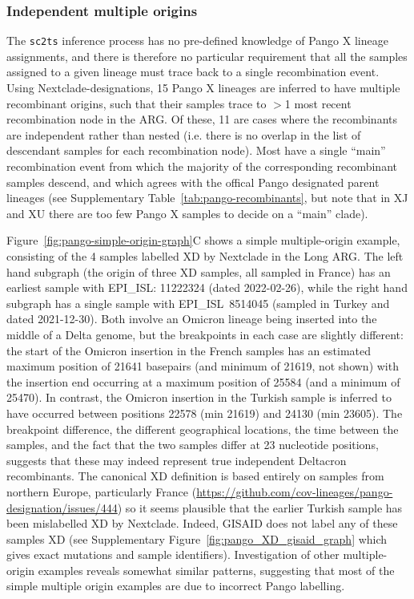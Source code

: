 \documentclass{article}
\begin{document}
\subsubsection{Independent multiple origins}
The \texttt{sc2ts} inference process has no pre-defined knowledge
of Pango X lineage assignments, and there is therefore no particular
requirement that all the samples assigned to a given lineage must trace back to
a single recombination event. Using Nextclade-designations, 15 Pango X lineages are
inferred to have multiple
recombinant origins, such that their samples trace to $>$1 most recent
recombination node in the ARG. Of these, 11 are cases where the
recombinants are independent rather than nested (i.e. there is no overlap in the list
of descendant samples for each recombination node). Most have a single ``main''
recombination event from which the majority of the corresponding recombinant samples
descend, and which agrees with the offical Pango designated parent lineages
(see Supplementary Table~\ref{tab:pango-recombinants}, but note that
in XJ and XU there are too few Pango X samples to decide on a ``main'' clade).

Figure~\ref{fig:pango-simple-origin-graph}C shows a simple multiple-origin example, consisting of
the 4 samples labelled XD by Nextclade in the Long ARG. The left hand subgraph
(the origin of three XD samples, all sampled in France) has an earliest
sample with EPI\_ISL: 11222324 (dated 2022-02-26), while the right hand
subgraph has a single sample with EPI\_ISL~8514045 (sampled in Turkey and dated 2021-12-30).
Both involve an Omicron lineage being inserted into the middle of a Delta genome, but
the breakpoints in each case are slightly different: the start of the Omicron insertion
in the French samples has an estimated maximum position of 21641 basepairs
(and minimum of 21619, not shown) with the insertion end occurring at a maximum position of 25584
(and a minimum of 25470). In contrast, the Omicron insertion in the Turkish sample
is inferred to have occurred between positions 22578 (min 21619) and 24130 (min 23605).
The breakpoint difference, the different geographical locations, the time between the
samples, and the fact that the two samples differ at 23 nucleotide positions,
suggests that these may indeed represent true independent Deltacron recombinants.
The canonical XD definition is based entirely on samples from northern Europe, particularly
France (\url{https://github.com/cov-lineages/pango-designation/issues/444}) so it seems
plausible that the earlier Turkish sample has been mislabelled XD by Nextclade.
Indeed, GISAID does not label any of these samples XD (see Supplementary
Figure~\ref{fig:pango_XD_gisaid_graph} which gives exact mutations and sample identifiers).
Investigation of other multiple-origin examples reveals somewhat similar patterns,
suggesting that most of the simple multiple origin examples are due to incorrect
Pango labelling.
\end{document}
